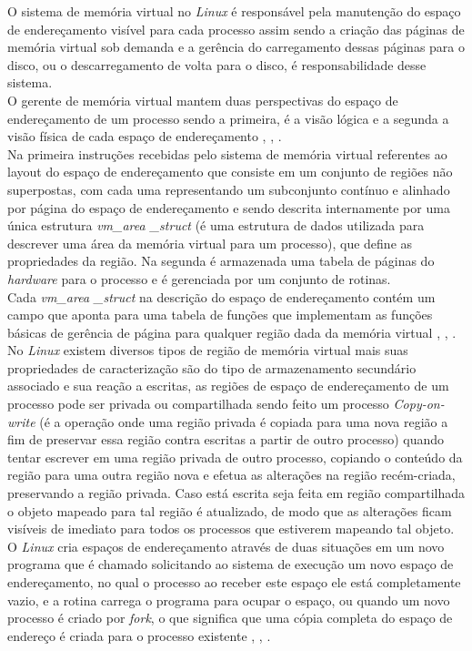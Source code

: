 O sistema de memória virtual no \emph{Linux} é responsável pela manutenção do espaço de endereçamento visível para cada processo assim sendo a criação das páginas de memória virtual sob demanda e a gerência do carregamento dessas páginas para o disco, ou o descarregamento de volta para o disco, é responsabilidade desse sistema.\\
O gerente de memória virtual mantem duas perspectivas do espaço de endereçamento de um processo sendo a primeira, é a visão lógica e a segunda a visão física de cada espaço de endereçamento \cite{ufscar2019}, \cite{silberschatz2000}, \cite{stallings2004}.\\
Na primeira instruções recebidas pelo sistema de memória virtual referentes  ao layout do espaço de endereçamento que consiste em um conjunto de regiões não superpostas, com cada uma representando um subconjunto contínuo e alinhado por página do espaço de endereçamento e sendo descrita internamente por uma única estrutura \emph{vm\_area \_struct} (é uma estrutura de dados utilizada para descrever uma área da memória virtual para um processo), que define as propriedades da região. Na segunda é armazenada uma tabela de páginas do \emph{hardware} para o processo e é gerenciada por um conjunto de rotinas.\\
 Cada \emph{vm\_area \_struct}  na descrição do espaço de endereçamento contém um campo que aponta para uma tabela de funções que implementam as funções básicas de gerência de página para qualquer região dada da memória virtual \cite{ufscar2019}, \cite{silberschatz2000}, \cite{stallings2004}.\\
No \emph{Linux} existem diversos tipos de região de memória virtual mais suas propriedades de caracterização são do tipo de armazenamento secundário associado e sua reação a escritas, as regiões de espaço de endereçamento de um processo pode ser privada ou compartilhada sendo feito um processo \emph{Copy-on-write} (é a operação onde uma região privada é copiada para uma nova região a fim de preservar essa região contra escritas a partir de outro processo) quando tentar escrever em uma região privada de outro processo, copiando o conteúdo da região para uma outra região nova e efetua as alterações na região recém-criada, preservando a região privada. Caso está escrita seja feita em região compartilhada o objeto mapeado para tal região é atualizado, de modo que as alterações ficam visíveis de imediato para todos os processos que estiverem mapeando tal objeto.\\
O \emph{Linux} cria espaços de endereçamento através de duas situações em um novo programa que é chamado solicitando ao sistema de execução um novo espaço de endereçamento, no qual o processo ao receber este espaço ele está completamente vazio, e a rotina carrega o programa para ocupar o espaço, ou quando um novo processo é criado por \emph{fork}, o que significa que uma cópia completa do espaço de endereço é criada para o processo existente \cite{ufscar2019}, \cite{silberschatz2000}, \cite{stallings2004}.


